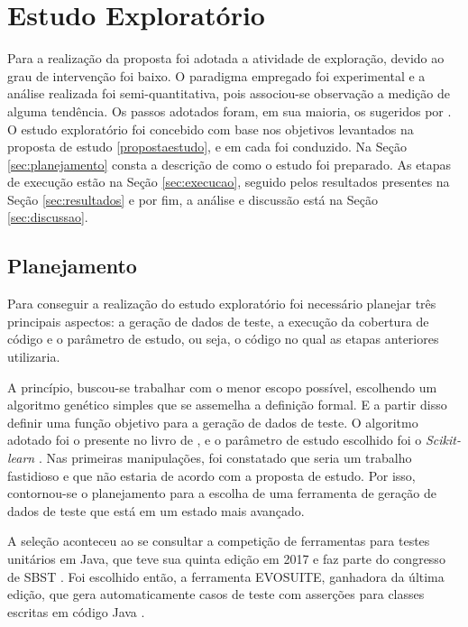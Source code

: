 \chapter[Estudo Exploratório]{Estudo Exploratório}

Para a realização da proposta foi adotada a atividade de exploração, devido ao grau de intervenção foi baixo. O paradigma empregado foi experimental e a análise realizada foi semi-quantitativa, pois associou-se observação a medição de alguma tendência. Os passos adotados foram, em sua maioria, os sugeridos por . O estudo exploratório foi concebido com base nos objetivos levantados na proposta de estudo \ref{propostaestudo}, e em cada foi conduzido. Na Seção \ref{sec:planejamento} consta a descrição de como o estudo foi preparado. As etapas de execução estão na Seção \ref{sec:execucao}, seguido pelos resultados presentes na Seção \ref{sec:resultados} e por fim, a análise e discussão está na Seção \ref{sec:discussao}.

\section{Planejamento \label{sec:planejamento}}

Para conseguir a realização do estudo exploratório foi necessário planejar três principais aspectos: a geração de dados de teste, a execução da cobertura de código e o parâmetro de estudo, ou seja, o código no qual as etapas anteriores utilizaria.

A princípio, buscou-se trabalhar com o menor escopo possível, escolhendo um algoritmo genético simples que se assemelha a definição formal. E a partir disso definir uma função objetivo para a geração de dados de teste. O algoritmo adotado foi o presente no livro de \cite{russell2016artificial}, e o parâmetro de estudo escolhido foi o \textit{Scikit-learn} \cite{pedregosa2011scikit}. Nas primeiras manipulações, foi constatado que seria um trabalho fastidioso e que não estaria de acordo com a proposta de estudo. Por isso, contornou-se o planejamento para a escolha de uma ferramenta de geração de dados de teste que está em um estado mais avançado. 

A seleção aconteceu ao se consultar a competição de ferramentas para testes unitários em Java, que teve sua quinta edição em 2017 e faz parte do congresso de SBST \cite{panichella2017java}. Foi escolhido então, a ferramenta EVOSUITE\footnotemark {}, ganhadora da última edição, que gera automaticamente casos de teste com asserções para classes escritas em código Java \cite{fraser2011evosuite}. 

